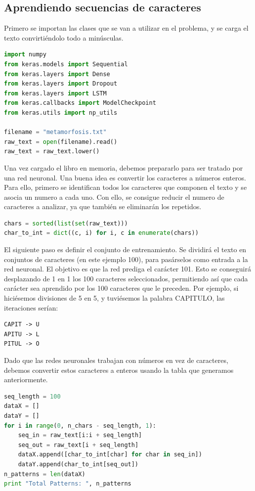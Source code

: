 \subsection{Aprendiendo secuencias de caracteres}
Primero se importan las clases que se van a utilizar en el problema, y se carga el texto convirtiéndolo todo a minúsculas.
\begin{lstlisting}[language=Python]
import numpy
from keras.models import Sequential
from keras.layers import Dense
from keras.layers import Dropout
from keras.layers import LSTM
from keras.callbacks import ModelCheckpoint
from keras.utils import np_utils

filename = "metamorfosis.txt"
raw_text = open(filename).read()
raw_text = raw_text.lower()
\end{lstlisting}
Una vez cargado el libro en memoria, debemos prepararlo para ser tratado por una red neuronal. Una buena idea es convertir los caracteres a números enteros. Para ello, primero se identifican todos los caracteres que componen el texto y se asocia un numero a cada uno. Con ello, se consigue reducir el numero de caracteres a analizar, ya que también se eliminarán los repetidos.
\begin{lstlisting}[language=Python]
chars = sorted(list(set(raw_text)))
char_to_int = dict((c, i) for i, c in enumerate(chars))
\end{lstlisting}
El siguiente paso es definir el conjunto de entrenamiento. Se dividirá el texto en conjuntos de caracteres (en este ejemplo 100), para pasárselos como entrada a la red neuronal. El objetivo es que la red prediga el carácter 101. Esto se conseguirá desplazando de 1 en 1 los 100 caracteres seleccionados, permitiendo así que cada carácter sea aprendido por los 100 caracteres que le preceden. Por ejemplo, si hiciésemos divisiones de 5 en 5, y tuviésemos la palabra CAPITULO, las iteraciones serían:
\begin{lstlisting}
CAPIT -> U
APITU -> L
PITUL -> O
\end{lstlisting}
Dado que las redes neuronales trabajan con números en vez de caracteres, debemos convertir estos caracteres a enteros usando la tabla que generamos anteriormente.
\begin{lstlisting}[language=Python]
seq_length = 100
dataX = []
dataY = []
for i in range(0, n_chars - seq_length, 1):
	seq_in = raw_text[i:i + seq_length]
	seq_out = raw_text[i + seq_length]
	dataX.append([char_to_int[char] for char in seq_in])
	dataY.append(char_to_int[seq_out])
n_patterns = len(dataX)
print "Total Patterns: ", n_patterns
\end{lstlisting}
